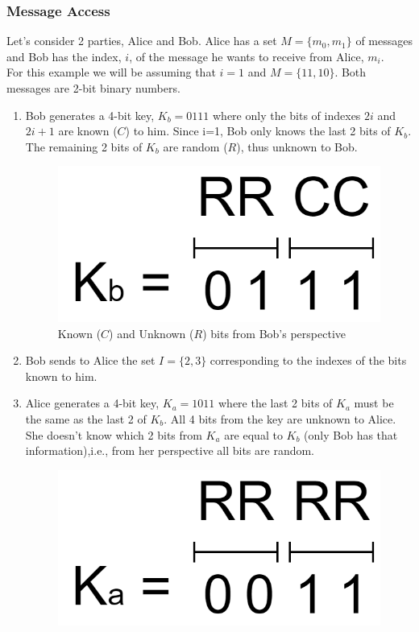 \subsubsection{Message Access}
Let's consider 2 parties, Alice and Bob. Alice has a set $M = \{m_0,m_1\}$ of messages and Bob has the index, $i$, of the message he wants to receive from Alice, $m_i$.\\
For this example we will be assuming that $i=1$ and $M = \{11,10\}$. Both messages are 2-bit binary numbers.
\begin{enumerate}
\item Bob generates a 4-bit key, $K_b=0111$ where only the bits of indexes $2i$ and $2i+1$ are known ($C$) to him. Since i=1, Bob only knows the last 2 bits of $K_b$. The remaining 2 bits of $K_b$ are random ($R$), thus unknown to Bob.
\renewcommand{\figurename}{Figure}
\begin{figure}[H]
\centering
\includegraphics[width=.25\linewidth]{./figures/mpc/mpc_bob_key}
\caption{Known ($C$) and Unknown ($R$) bits from Bob's perspective }
\label{fig:knownbob}
\end{figure}
\item Bob sends to Alice the set $I = \{2,3\}$ corresponding to the indexes of the bits known to him.
\item Alice generates a 4-bit key, $K_a=1011$ where the last 2 bits of $K_a$ must be the same as the last 2 of $K_b$. All 4 bits from the key
are unknown to Alice. She doesn't know which 2 bits from $K_a$ are equal to $K_b$ (only Bob has that information),i.e., from her perspective
all bits are random.
\renewcommand{\figurename}{Figure}
\begin{figure}[H]
\centering
\includegraphics[width=.25\linewidth]{./figures/mpc/mpc_alice_key}

\end{figure}
\end{enumerate}
